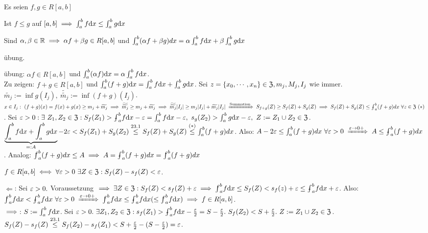 \documentclass[a4paper,oneside,DIV15,BCOR12mm]{scrbook}
\begin{document}
\begin{satz}
Es seien $f,g \in R[a, b]$
\begin{liste}
\item Ist $f\le g$ auf $[a, b] \implies \int_a^bf\text{d}x \le \int_a^bg\text{d}x$
\item Sind $\alpha, \beta \in \mathbb{R} \implies \alpha f + \beta g \in R[a, b]$ und $\int_a^b(\alpha f + \beta g)dx = \alpha\int_a^bf\text{d}x + \beta\int_a^bg\text{d}x$
\end{liste}
\end{satz}

\begin{beweise}
\item übung.
\item übung: $\alpha f \in R[a, b]$ und $\int_a^b(\alpha f)\text{d}x=\alpha\int_a^bf\text{d}x$.\\Zu zeigen: $f+g \in R[a, b]$ und $\int_a^b(f+g)\text{d}x = \int_a^bf\text{d}x + \int_a^bg\text{d}x$.
Sei $z=\{x_0, \cdots, x_n\} \in \mathfrak{Z}, m_j, M_j, I_j$ wie immer. $\widetilde{m_j}:=\inf g(I_j),\ \widetilde{\widetilde{m_j}}:=\inf (f+g)(I_j)$. $x\in I_j:\ (f+g)(x)=f(x)+g(x) \ge m_j + \widetilde{m_j} \folgt \widetilde{\widetilde{m_j}}\ge m_j + \widetilde{m_j} \folgt \widetilde{\widetilde{m_j}}|I_j| \ge m_j|I_j| + \widetilde{m_j}|I_j| \folgtnach{Summation} S_{f+g}(Z) \ge S_f(Z) + S_g(Z) \folgt S_f(Z) + S_g(Z) \le \uint_a^b(f+g)dx \ \forall z \in \Z\ (*)$. Sei $\ep>0: \exists\ Z_1, Z_2 \in \Z: S_f(Z_1) > \uint_a^bf\dx - \ep=\int_a^bf\dx - \ep,\ s_g(Z_2)>\int_a^bg\dx - \ep,\ Z:=Z_1 \cup Z_2 \in \Z$. $\underbrace{\int_a^bf\text{d}x + \int_a^bg\text{d}x}_{=:A} - 2\varepsilon < S_f(Z_1) + S_g(Z_2) \overset{23.1}{\le} S_f(Z) + S_g(Z) \overset{(*)}{\le} \int_a^b (f+g)dx$. Also: $A-2\ep \le \int_a^b(f+g)dx\ \forall \ep>0 \folgtwegen{\ep \to 0+} A\le\uint_a^b(f+g)dx$. Analog: $\oint_a^b(f+g)dx\le A \folgt A=\uint_a^b(f+g)dx = \oint_a^b(f+g)dx$
\end{beweise}

\begin{satz}
$f \in R[a,b] \equizu \forall \ep>0\ \exists Z \in \Z: S_f(Z)-s_f(Z) < \ep$.
\end{satz}
\begin{beweis}
\glqq$\Leftarrow$\grqq: Sei $\varepsilon>0.$ Voraussetzung $\folgt \exists Z \in \Z: S_f(Z)<s_f(Z)+\ep \folgt \oint_a^bf\dx \le S_f(Z) < s_f(z) + \ep\le\uint_a^bf\dx + \ep$. Also: $\oint_a^bf\dx < \uint_a^bf\dx\ \forall \ep>0\folgtwegen{\ep\to 0+}\oint_a^bf\dx \le \uint_a^bf\dx (\le \oint_a^bf\dx)\folgt f\in R[a, b]$.\\
\glqq$\implies$\grqq: $S:=\int_a^bf\text{d}x$. Sei $\ep>0.\ \exists Z_1, Z_2 \in \Z: s_f(Z_1) > \uint_a^bf\dx - \frac{\ep}{2}=S-\frac{\ep}{2}.\ S_f(Z_2)<S+\frac{\ep}{2}.\ Z:=Z_1 \cup Z_2 \in \Z$. $S_f(Z)-s_f(Z) \overset{23.1}{\le}S_f(Z_2)-s_f(Z_1)<S+\frac{\varepsilon}{2}-(S-\frac{\varepsilon}{2})=\varepsilon$.
\end{beweis}
\end{document}

